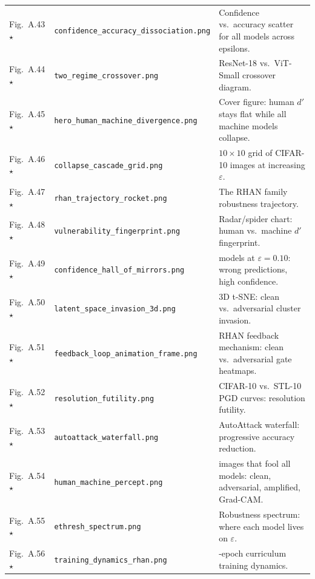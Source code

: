 \documentclass[12pt,a4paper]{article}
\begin{document}
\begin{longtable}{>{\raggedright\arraybackslash}p{2.1cm} >{\raggedright\arraybackslash}p{5.2cm} >{\raggedright\arraybackslash}p{\dimexpr\textwidth-2.1cm-5.2cm-4\tabcolsep\relax}}
Fig.~A.43$\star$ & \texttt{confidence\_\allowbreak{}accuracy\_\allowbreak{}dissociation.png} &
Confidence vs.\ accuracy scatter for all models across epsilons. \\
Fig.~A.44$\star$ & \texttt{two\_\allowbreak{}regime\_\allowbreak{}crossover.png} &
ResNet-18 vs.\ ViT-Small crossover diagram. \\
\midrule
Fig.~A.45$\star$ & \texttt{hero\_\allowbreak{}human\_\allowbreak{}machine\_\allowbreak{}divergence.png} &
Cover figure: human $d'$ stays flat while all machine models collapse. \\
Fig.~A.46$\star$ & \texttt{collapse\_\allowbreak{}cascade\_\allowbreak{}grid.png} &
$10{\times}10$ grid of CIFAR-10 images at increasing $\varepsilon$. \\
Fig.~A.47$\star$ & \texttt{rhan\_\allowbreak{}trajectory\_\allowbreak{}rocket.png} &
The RHAN family robustness trajectory. \\
Fig.~A.48$\star$ & \texttt{vulnerability\_\allowbreak{}fingerprint.png} &
Radar/spider chart: human vs.\ machine $d'$ fingerprint. \\
Fig.~A.49$\star$ & \texttt{confidence\_\allowbreak{}hall\_\allowbreak{}of\_\allowbreak{}mirrors.png} &
6 models at $\varepsilon{=}0.10$: wrong predictions, high confidence. \\
Fig.~A.50$\star$ & \texttt{latent\_\allowbreak{}space\_\allowbreak{}invasion\_\allowbreak{}3d.png} &
3D t-SNE: clean vs.\ adversarial cluster invasion. \\
Fig.~A.51$\star$ & \texttt{feedback\_\allowbreak{}loop\_\allowbreak{}animation\_\allowbreak{}frame.png} &
RHAN feedback mechanism: clean vs.\ adversarial gate heatmaps. \\
Fig.~A.52$\star$ & \texttt{resolution\_\allowbreak{}futility.png} &
CIFAR-10 vs.\ STL-10 PGD curves: resolution futility. \\
Fig.~A.53$\star$ & \texttt{autoattack\_\allowbreak{}waterfall.png} &
AutoAttack waterfall: progressive accuracy reduction. \\
Fig.~A.54$\star$ & \texttt{human\_\allowbreak{}machine\_\allowbreak{}percept.png} &
5 images that fool all models: clean, adversarial, amplified, Grad-CAM. \\
Fig.~A.55$\star$ & \texttt{ethresh\_\allowbreak{}spectrum.png} &
Robustness spectrum: where each model lives on $\varepsilon$. \\
Fig.~A.56$\star$ & \texttt{training\_\allowbreak{}dynamics\_\allowbreak{}rhan.png} &
60-epoch curriculum training dynamics. \\
\end{longtable}
\endgroup
\end{document}
